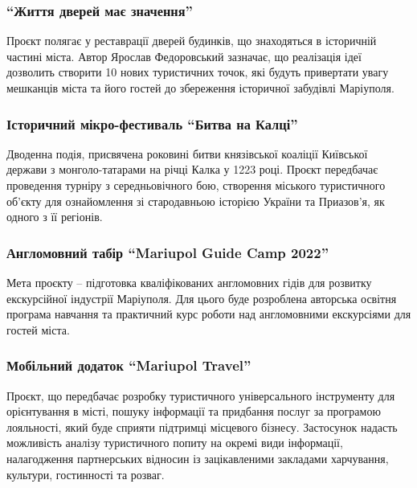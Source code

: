 \subsubsection{\enquote{Життя дверей має значення}}

Проєкт полягає у реставрації дверей будинків, що знаходяться в історичній
частині міста. Автор Ярослав Федоровський зазначає, що реалізація ідеї
дозволить створити 10 нових туристичних точок, які будуть привертати увагу
мешканців міста та його гостей до  збереження історичної забудівлі Маріуполя.


\subsubsection{Історичний мікро-фестиваль \enquote{Битва на Калці}}

Дводенна подія, присвячена роковині битви князівської коаліції Київської
держави з монголо-татарами на річці Калка у 1223 році. Проєкт передбачає
проведення турніру з середньовічного бою, створення міського туристичного
об'єкту для ознайомлення зі стародавньою історією України та Приазов'я, як
одного з її регіонів.


\subsubsection{Англомовний табір \enquote{Mariupol Guide Camp 2022}}

Мета проєкту – підготовка кваліфікованих англомовних гідів для розвитку
екскурсійної індустрії Маріуполя. Для цього буде розроблена авторська освітня
програма навчання та практичний курс роботи над англомовними екскурсіями для
гостей міста.


\subsubsection{Мобільний додаток \enquote{Mariupol Travel}}

Проєкт, що передбачає розробку туристичного універсального інструменту для
орієнтування в місті, пошуку інформації та придбання послуг за програмою
лояльності, який буде сприяти підтримці місцевого бізнесу. Застосунок надасть
можливість аналізу туристичного попиту на окремі види інформації, налагодження
партнерських відносин із зацікавленими закладами харчування, культури,
гостинності та розваг.

